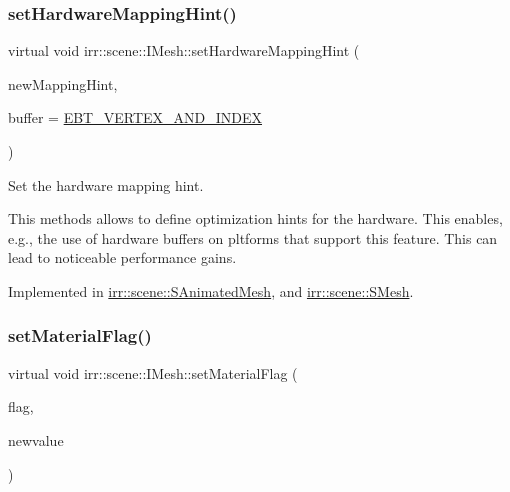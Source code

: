 \subsubsection{\texorpdfstring{set\+Hardware\+Mapping\+Hint()}{setHardwareMappingHint()}}
{\footnotesize\ttfamily virtual void irr\+::scene\+::\+I\+Mesh\+::set\+Hardware\+Mapping\+Hint (\begin{DoxyParamCaption}\item[{\hyperlink{namespaceirr_1_1scene_ac7d8ee8d77da75f2580bb9bb17231c27}{E\+\_\+\+H\+A\+R\+D\+W\+A\+R\+E\+\_\+\+M\+A\+P\+P\+I\+NG}}]{new\+Mapping\+Hint,  }\item[{\hyperlink{namespaceirr_1_1scene_a8f59a89ffef0ad8e5b2c2cb874a93e8c}{E\+\_\+\+B\+U\+F\+F\+E\+R\+\_\+\+T\+Y\+PE}}]{buffer = {\ttfamily \hyperlink{namespaceirr_1_1scene_a8f59a89ffef0ad8e5b2c2cb874a93e8ca833624730c30cffccc121fe31aa0832c}{E\+B\+T\+\_\+\+V\+E\+R\+T\+E\+X\+\_\+\+A\+N\+D\+\_\+\+I\+N\+D\+EX}} }\end{DoxyParamCaption})\hspace{0.3cm}{\ttfamily [pure virtual]}}



Set the hardware mapping hint. 

This methods allows to define optimization hints for the hardware. This enables, e.\+g., the use of hardware buffers on pltforms that support this feature. This can lead to noticeable performance gains. 

Implemented in \hyperlink{structirr_1_1scene_1_1SAnimatedMesh_a69448fa91bd1c6316d11d9ae3b8b88e6}{irr\+::scene\+::\+S\+Animated\+Mesh}, and \hyperlink{structirr_1_1scene_1_1SMesh_a79839b08062bfcd283e441056bf846e6}{irr\+::scene\+::\+S\+Mesh}.

\mbox{\label{classirr_1_1scene_1_1IMesh_a56e034b671f52653d6c91e0ffa42febd}} 
\subsubsection{\texorpdfstring{set\+Material\+Flag()}{setMaterialFlag()}}
{\footnotesize\ttfamily virtual void irr\+::scene\+::\+I\+Mesh\+::set\+Material\+Flag (\begin{DoxyParamCaption}\item[{\hyperlink{namespaceirr_1_1video_a8a3bc00ae8137535b9fbc5f40add70d3}{video\+::\+E\+\_\+\+M\+A\+T\+E\+R\+I\+A\+L\+\_\+\+F\+L\+AG}}]{flag,  }\item[{bool}]{newvalue }\end{DoxyParamCaption})\hspace{0.3cm}{\ttfamily [pure virtual]}}



